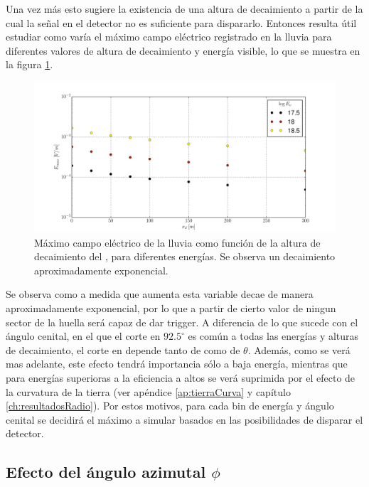 	Una vez m\'as esto sugiere la existencia de una altura de decaimiento a partir de la cual la se\~nal en el detector no es suficiente para dispararlo.
	Entonces resulta \'util estudiar como var\'ia el m\'aximo campo el\'ectrico registrado en la lluvia para diferentes valores de altura de decaimiento y energ\'ia visible, lo que se muestra en la figura \ref{fig:xd_dependence2}.
	\begin{figure}[ht!]
		\centering
		\includegraphics[width=\textwidth]{./fig/simulacionRadio/maxDep/eMaxXd}
		\caption{\label{fig:xd_dependence2}
		M\'aximo campo el\'ectrico de la lluvia como funci\'on de la altura de decaimiento del \tauon{}, para diferentes energ\'ias.
		Se observa un decaimiento aproximadamente exponencial.
		}
	\end{figure}
	
	Se observa como a medida que \xd{} aumenta esta variable decae de manera aproximadamente exponencial, por lo que a partir de cierto valor de \xd{} ningun sector de la huella ser\'a capaz de dar trigger.
	A diferencia de lo que sucede con el \'angulo cenital, en el que el corte en $92.5^\circ$ es com\'un a todas las energ\'ias y alturas de decaimiento, el corte en \xd{} depende tanto de \ev{} como de $\theta$.
	Adem\'as, como se ver\'a mas adelante, este efecto tendr\'a importancia s\'olo a baja energ\'ia, mientras que para energ\'ias superioras a  la eficiencia a altos \xd{} se ver\'a suprimida por el efecto de la curvatura de la tierra (ver ap\'endice \ref{ap:tierraCurva} y cap\'itulo \ref{ch:resultadosRadio}).
	Por estos motivos, para cada bin de energ\'ia y \'angulo cenital se decidir\'a el m\'aximo \xd{} a simular basados en las posibilidades de disparar el detector.
	
	\subsection{Efecto del \'angulo azimutal $\phi$}
	
